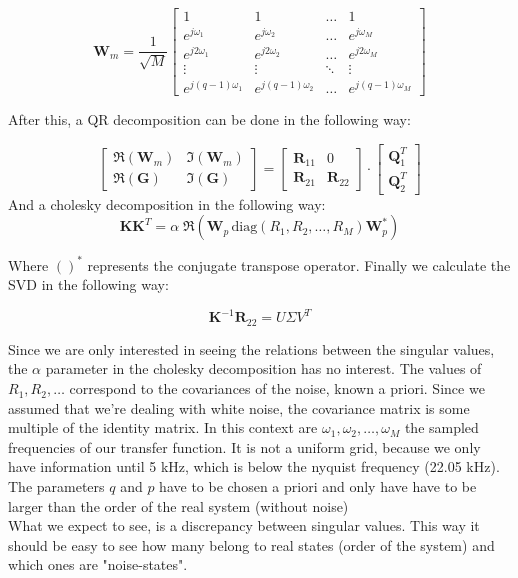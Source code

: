 \[
\textbf{W}_m = \frac{1}{\sqrt{M}}
\begin{bmatrix}
1 & 1 & \dots & 1 \\
e^{j\omega_1} & e^{j\omega_2} & \dots & e^{j\omega_M} \\
e^{j2\omega_1} & e^{j2\omega_2} & \dots & e^{j2\omega_M} \\
\vdots & \vdots & \ddots & \vdots \\
e^{j(q-1)\omega_1} &e^{j(q-1)\omega_2} & \dots & e^{j(q-1)\omega_M} 
\end{bmatrix}\]

After this, a QR decomposition can be done in the following way:

\[\begin{bmatrix}
\Re(\textbf{W}_m) & \Im(\textbf{W}_m) \\
\Re(\textbf{G}) & \Im(\textbf{G})
\end{bmatrix} = 
\begin{bmatrix}
\textbf{R}_{11} & 0 \\
\textbf{R}_{21} & \textbf{R}_{22}
\end{bmatrix}\cdot
 \begin{bmatrix}
\textbf{Q}_1^T  \\
\textbf{Q}_2^T
\end{bmatrix}
\]
And a cholesky decomposition in the following way:
\[\textbf{K}\textbf{K}^T = \alpha\;\Re(\textbf{W}_p\,\text{diag}(R_1,R_2,\dots, R_M)\textbf{W}_p^*)\]

Where $()^*$ represents the conjugate transpose operator. Finally we calculate the SVD in the following way:

\[\textbf{K}^{-1}\textbf{R}_{22} = U\Sigma V^T\]

Since we are only interested in seeing the relations between the singular values, the $\alpha$ parameter in the cholesky decomposition has no interest. The values of $R_1, R_2, \dots$ correspond to the covariances of the noise, known a priori. Since we assumed that we're dealing with white noise, the covariance matrix is some multiple of the identity matrix. In this context are $\omega_1, \omega_2,\dots,\omega_M$ the sampled frequencies of our transfer function. It is not a uniform grid, because we only have information until 5 kHz, which is below the nyquist frequency (22.05 kHz). The parameters $q$ and $p$ have to be chosen a priori and only have have to be larger than the order of the real system (without noise)\\

What we expect to see, is a discrepancy between singular values. This way it should be easy to see how many belong to real states (order of the system) and which ones are "noise-states".

